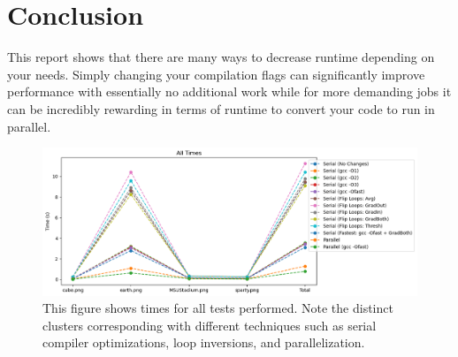 \documentclass[9pt, technote, onecolumn]{IEEEtran}
\begin{document}
\section{Conclusion}

This report shows that there are many ways to decrease runtime depending on your needs. Simply changing your compilation flags can significantly improve performance with essentially no additional work while for more demanding jobs it can be incredibly rewarding in terms of runtime to convert your code to run in parallel.

\newpage

\begin{figure}
\centering
\includegraphics[width=6in]{AllTimes.png}
\caption{This figure shows times for all tests performed. Note the distinct clusters corresponding with different techniques such as serial compiler optimizations, loop inversions, and parallelization.}
\end{figure}
\end{document}
